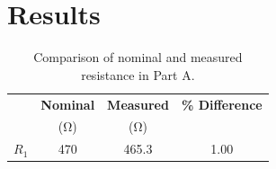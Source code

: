 \documentclass{article}
\begin{document}
\section{Results}
\label{sec:results}


\begin{table}[hbtp]
  \centering
  \begin{tabular}{*{4}{c}}
    & \textbf{Nominal} & \textbf{Measured} & \textbf{\% Difference} \\
    & (\si{\ohm}) & (\si{\ohm}) & \\
    \hline
    $R_1$ & 470 & 465.3 & 1.00 \\
  \end{tabular}
  \caption{\label{tab:percent_diff} Comparison of nominal and measured resistance in Part A.}
\end{table}
\end{document}
